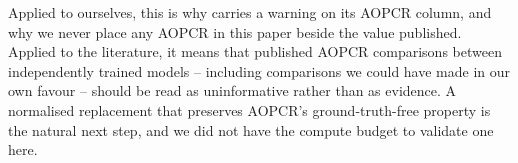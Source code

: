Applied to ourselves, this is why  carries a warning on its AOPCR column, and why we
never place any AOPCR in this paper beside the value \millet{} published. Applied to the literature,
it means that published AOPCR comparisons between independently trained models -- including
comparisons we could have made in our own favour -- should be read as uninformative rather than as
evidence. A normalised replacement that preserves AOPCR's ground-truth-free property is the natural
next step, and we did not have the compute budget to validate one here.
